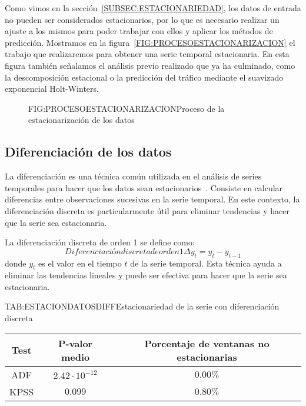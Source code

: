 Como vimos en la sección~\ref{SUBSEC:ESTACIONARIEDAD}, los datos de entrada no pueden ser considerados estacionarios, por lo que es necesario realizar un ajuste a los mismos para poder trabajar con ellos y aplicar los métodos de predicción.
Mostramos en la figura~\ref{FIG:PROCESOESTACIONARIZACION} el trabajo que realizaremos para obtener una serie temporal estacionaria. En esta figura también señalamos el análisis previo realizado que ya ha culminado, como la descomposición estacional o la predicción del tráfico mediante el suavizado exponencial Holt-Winters.

\begin{figure}[Proceso de la estacionarización de los datos]{FIG:PROCESOESTACIONARIZACION}{Proceso de la estacionarización de los datos}
\end{figure}

\subsection{Diferenciación de los datos}

La diferenciación es una técnica común utilizada en el análisis de series temporales para hacer que los datos sean estacionarios~\cite{box2015time}. Consiste en calcular diferencias entre observaciones sucesivas en la serie temporal. En este contexto, la diferenciación discreta es particularmente útil para eliminar tendencias y hacer que la serie sea estacionaria.

La diferenciación discreta de orden 1 se define como:
\begin{equation}{Diferenciación discreta de orden 1}    
    \Delta y_t = y_t - y_{t-1}
\end{equation}
donde \( y_t \) es el valor en el tiempo \( t \) de la serie temporal. Esta técnica ayuda a eliminar las tendencias lineales y puede ser efectiva para hacer que la serie sea estacionaria.

\begin{table}[Estacionariedad de la serie con diferenciación discreta]{TAB:ESTACIONDATOSDIFF}{Estacionariedad de la serie con diferenciación discreta}
    \begin{tabular}{|c|c|c|}
        \hline
        \textbf{Test} & \textbf{P-valor medio} & \textbf{Porcentaje de ventanas no estacionarias} \\
        \hline
        ADF & $2.42\cdot 10^{-12}$ & $0.00\%$ \\
        KPSS & $0.099$ & $0.80\%$ \\
        \hline
    \end{tabular}
\end{table}

